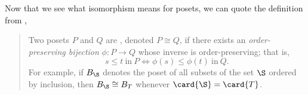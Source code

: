 Now that we see what isomorphism means for posets, we can quote the definition
from \citet*{Stanley:2011:ECV:2124415},

\begin{quotation}

Two posets $P$ and $Q$ are , denoted $P \cong Q$, if
there exists an \emph{order-preserving bijection} $\phi : P \to Q$ whose
inverse is order-preserving; that is, $$s \leq t~\text{in}~P \iff \phi(s) \leq
\phi(t)~\text{in}~Q.$$ For example, if $B_{\S}$ denotes the poset of all subsets
of the set $\S$ ordered by inclusion, then $B_{\S} \cong B_T$ whenever $\card{\S} =
\card{T}$.

\end{quotation}
